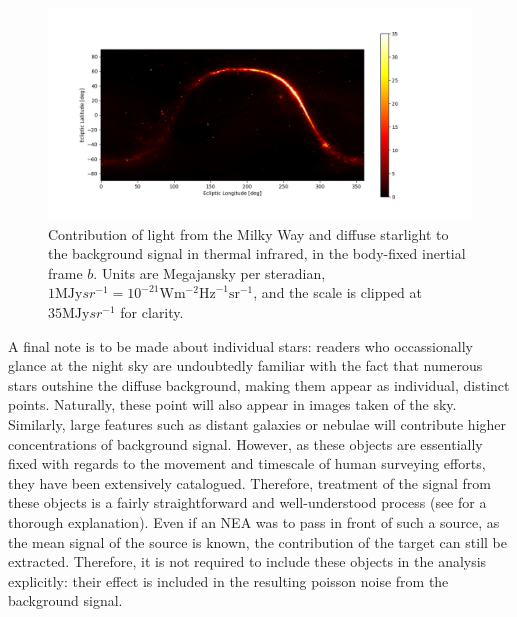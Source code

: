\begin{figure}[htbp]
 \centering
 \includegraphics[width=1.0\textwidth]{img/background_tir_stars.png}
 \caption{Contribution of light from the Milky Way and diffuse starlight to the background signal in thermal infrared, in the body-fixed inertial frame $b$. Units are Megajansky per steradian, $1 \mathrm{MJy}{sr}^{-1} = 10^{-21} \mathrm{W}\mathrm{m}^{-2}\mathrm{Hz}^{-1}\mathrm{sr}^{-1}$, and the scale is clipped at $35 \mathrm{MJy}{sr}^{-1}$ for clarity.}
 \label{fig:starstirbackground}
\end{figure}

A final note is to be made about individual stars: readers who occassionally glance at the night sky are undoubtedly familiar with the fact that numerous stars outshine the diffuse background, making them appear as individual, distinct points. Naturally, these point will also appear in images taken of the sky. Similarly, large features such as distant galaxies or nebulae will contribute higher concentrations of background signal. However, as these objects are essentially fixed with regards to the movement and timescale of human surveying efforts, they have been extensively catalogued. Therefore, treatment of the signal from these objects is a fairly straightforward and well-understood process (see \cite{StarRemoval} for a thorough explanation). Even if an NEA was to pass in front of such a source, as the mean signal of the source is known, the contribution of the target can still be extracted. Therefore, it is not required to include these objects in the analysis explicitly: their effect is included in the resulting poisson noise from the background signal.

